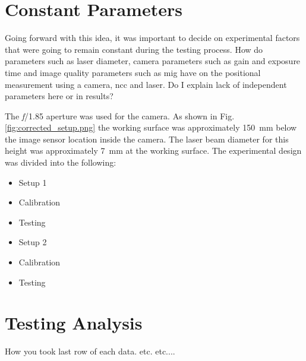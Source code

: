 \section{Constant Parameters}\label{section:constant_parameters}

\noindent Going forward with this idea, it was important to decide on experimental factors that were going to remain constant during the testing process. How do parameters such as laser diameter, camera parameters such as gain and exposure time and image quality parameters such as \gls{mig} have on the positional measurement using a camera, \gls{ncc} and laser. Do I explain lack of independent parameters here or in results?

\vspace{5mm}

\noindent The \emph{f}/1.85 aperture was used for the camera. As shown in Fig. \ref{fig:corrected_setup.png} the working surface was approximately \SI{150}{\milli\meter} below the image sensor location inside the camera. The laser beam diameter for this height was approximately \SI{7}{\milli\meter} at the working surface. The experimental design was divided into the following:
\begin{itemize}
    \item Setup 1
    \item Calibration
    \item Testing
    \item Setup 2
    \item Calibration
    \item Testing
\end{itemize}

\section{Testing Analysis}
How you took last row of each data. etc. etc....

